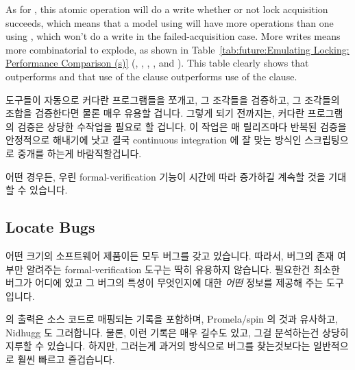 {	As for , this atomic operation will do a
	write whether or not lock acquisition succeeds, which means
	that a model using  will have more operations
	than one using , which won't do a write
	in the failed-acquisition case.
	More writes means more combinatorial to explode, as shown in
	Table~\ref{tab:future:Emulating Locking: Performance Comparison (s)}
	(,
	,
	,
	, and
	).
	This table clearly shows that 
	outperforms  and that use of the
	 clause outperforms use of the  clause.
	\fi
} \QuickQuizEnd

도구들이 자동으로 커다란 프로그램들을 쪼개고, 그 조각들을 검증하고, 그 조각들의
조합을 검증한다면 물론 매우 유용할 겁니다.
그렇게 되기 전까지는, 커다란 프로그램의 검증은 상당한 수작업을 필요로 할
겁니다.
이 작업은 매 릴리즈마다 반복된 검증을 안정적으로 해내기에 낫고 결국 continuous
integration 에 잘 맞는 방식인 스크립팅으로 중개를 하는게 바람직할겁니다.

어떤 경우든, 우린 formal-verification 기능이 시간에 따라 증가하길 계속할 것을
기대할 수 있습니다.
\iffalse

It would of course be quite useful for tools to automatically divide
up large programs, verify the pieces, and then verify the combinations
of pieces.
In the meantime, verification of large programs will require significant
manual intervention.
This intervention will preferably mediated by scripting, the better to
reliably carry out repeated verifications on each release, and
preferably eventually in a manner well-suited for continuous integration.

In any case, we can expect formal-verification capabilities to continue
to increase over time.
\fi

\subsection{Locate Bugs}
\label{sec:future:Locate Bugs}

어떤 크기의 소프트웨어 제품이든 모두 버그를 갖고 있습니다.
따라서, 버그의 존재 여부만 알려주는 formal-verification 도구는 딱히 유용하지
않습니다.
필요한건 최소한 버그가 어디에 있고 그 버그의 특성이 무엇인지에 대한 \emph{어떤}
정보를 제공해 주는 도구입니다.

 의 출력은 소스 코드로 매핑되는 기록을 포함하며, Promela/spin 의 것과
유사하고, Nidhugg 도 그러합니다.
물론, 이런 기록은 매우 길수도 있고, 그걸 분석하는건 상당히 지루할 수 있습니다.
하지만, 그러는게 과거의 방식으로 버그를 찾는것보다는 일반적으로 훨씬 빠르고
즐겁습니다.
\iffalse

